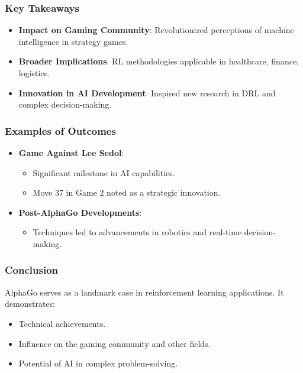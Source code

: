\documentclass[aspectratio=169]{beamer}
\begin{document}
\begin{frame}[fragile]
  \frametitle{Key Takeaways}
  \begin{itemize}
    \item \textbf{Impact on Gaming Community}: Revolutionized perceptions of machine intelligence in strategy games.
    \item \textbf{Broader Implications}: RL methodologies applicable in healthcare, finance, logistics.
    \item \textbf{Innovation in AI Development}: Inspired new research in DRL and complex decision-making.
  \end{itemize}
\end{frame}

\begin{frame}[fragile]
  \frametitle{Examples of Outcomes}
  \begin{itemize}
    \item \textbf{Game Against Lee Sedol}: 
      \begin{itemize}
        \item Significant milestone in AI capabilities.
        \item Move 37 in Game 2 noted as a strategic innovation.
      \end{itemize}
    
    \item \textbf{Post-AlphaGo Developments}: 
      \begin{itemize}
        \item Techniques led to advancements in robotics and real-time decision-making.
      \end{itemize}
  \end{itemize}
\end{frame}

\begin{frame}[fragile]
  \frametitle{Conclusion}
  AlphaGo serves as a landmark case in reinforcement learning applications. It demonstrates:
  \begin{itemize}
    \item Technical achievements.
    \item Influence on the gaming community and other fields.
    \item Potential of AI in complex problem-solving.
  \end{itemize}
\end{frame}
\end{document}
